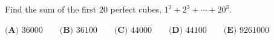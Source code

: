 Find the sum of the first $20$ perfect cubes, $1^3+2^3+\cdots+20^3$.

$\textbf{(A) }36000\qquad\textbf{(B) }36100\qquad\textbf{(C) }44000\qquad\textbf{(D) }44100\qquad\textbf{(E) }9261000$
